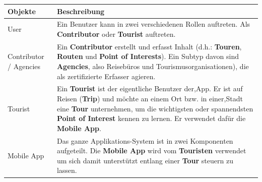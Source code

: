 \documentclass[a4paper,10pt,xetex]{article}
\begin{document}
\begin{longtable}[]{@{}ll@{}}
\toprule
\begin{minipage}[b]{0.08\columnwidth}\raggedright\strut
\textbf{Objekte}\strut
\end{minipage} & \begin{minipage}[b]{0.86\columnwidth}\raggedright\strut
\textbf{Beschreibung}\strut
\end{minipage}\tabularnewline
\midrule
\endhead
\begin{minipage}[t]{0.08\columnwidth}\raggedright\strut
User\strut
\end{minipage} & \begin{minipage}[t]{0.86\columnwidth}\raggedright\strut
Ein Benutzer kann in zwei verschiedenen Rollen auftreten. Als
\textbf{Contributor} oder \textbf{Tourist} auftreten.\strut
\end{minipage}\tabularnewline
\begin{minipage}[t]{0.08\columnwidth}\raggedright\strut
Contributor / Agencies\strut
\end{minipage} & \begin{minipage}[t]{0.86\columnwidth}\raggedright\strut
Ein \textbf{Contributor} erstellt und erfasst Inhalt (d.h.:
\textbf{Touren}, \textbf{Routen} und \textbf{Point of Interests}). Ein
Subtyp davon sind \textbf{Agencies}, also Reisebüros und
Tourismusorganisationen), die als zertifizierte Erfasser agieren.\strut
\end{minipage}\tabularnewline
\begin{minipage}[t]{0.08\columnwidth}\raggedright\strut
Tourist\strut
\end{minipage} & \begin{minipage}[t]{0.86\columnwidth}\raggedright\strut
Ein \textbf{Tourist} ist der eigentliche Benutzer der,App. Er ist auf
Reisen (\textbf{Trip}) und möchte an einem Ort bzw. in einer,Stadt eine
\textbf{Tour} unternehmen, um die wichtigsten oder spannendsten
\textbf{Point of Interest} kennen zu lernen. Er verwendet dafür die
\textbf{Mobile App}.\strut
\end{minipage}\tabularnewline
\begin{minipage}[t]{0.08\columnwidth}\raggedright\strut
Mobile App\strut
\end{minipage} & \begin{minipage}[t]{0.86\columnwidth}\raggedright\strut
Das ganze Applikations-System ist in zwei Komponenten aufgeteilt. Die
\textbf{Mobile App} wird vom \textbf{Touristen} verwendet um sich damit
unterstützt entlang einer \textbf{Tour} steuern zu lassen.\strut

\end{minipage}
\end{longtable}
\end{document}

